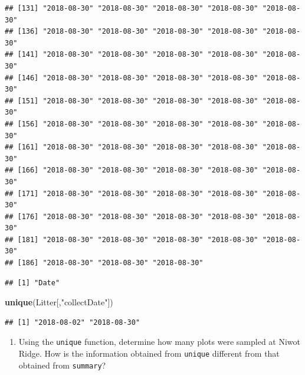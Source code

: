 \documentclass[]{article}
\newenvironment{Shaded}{\begin{snugshade}}{\end{snugshade}}
\newcommand{\KeywordTok}[1]{\textcolor[rgb]{0.13,0.29,0.53}{\textbf{#1}}}
\newcommand{\StringTok}[1]{\textcolor[rgb]{0.31,0.60,0.02}{#1}}
\newcommand{\OperatorTok}[1]{\textcolor[rgb]{0.81,0.36,0.00}{\textbf{#1}}}
\newcommand{\NormalTok}[1]{#1}
\providecommand{\tightlist}{%
  \setlength{\itemsep}{0pt}\setlength{\parskip}{0pt}}
\begin{document}
\begin{verbatim}
## [131] "2018-08-30" "2018-08-30" "2018-08-30" "2018-08-30" "2018-08-30"
## [136] "2018-08-30" "2018-08-30" "2018-08-30" "2018-08-30" "2018-08-30"
## [141] "2018-08-30" "2018-08-30" "2018-08-30" "2018-08-30" "2018-08-30"
## [146] "2018-08-30" "2018-08-30" "2018-08-30" "2018-08-30" "2018-08-30"
## [151] "2018-08-30" "2018-08-30" "2018-08-30" "2018-08-30" "2018-08-30"
## [156] "2018-08-30" "2018-08-30" "2018-08-30" "2018-08-30" "2018-08-30"
## [161] "2018-08-30" "2018-08-30" "2018-08-30" "2018-08-30" "2018-08-30"
## [166] "2018-08-30" "2018-08-30" "2018-08-30" "2018-08-30" "2018-08-30"
## [171] "2018-08-30" "2018-08-30" "2018-08-30" "2018-08-30" "2018-08-30"
## [176] "2018-08-30" "2018-08-30" "2018-08-30" "2018-08-30" "2018-08-30"
## [181] "2018-08-30" "2018-08-30" "2018-08-30" "2018-08-30" "2018-08-30"
## [186] "2018-08-30" "2018-08-30" "2018-08-30"
\end{verbatim}

\begin{Shaded}
\end{Shaded}

\begin{verbatim}
## [1] "Date"
\end{verbatim}

\begin{Shaded}
\begin{Highlighting}[]
\KeywordTok{unique}\NormalTok{(Litter[,}\StringTok{"collectDate"}\NormalTok{])}
\end{Highlighting}
\end{Shaded}

\begin{verbatim}
## [1] "2018-08-02" "2018-08-30"
\end{verbatim}

\begin{enumerate}
\def\labelenumi{\arabic{enumi}.}
\setcounter{enumi}{12}
\tightlist
\item
  Using the \texttt{unique} function, determine how many plots were
  sampled at Niwot Ridge. How is the information obtained from
  \texttt{unique} different from that obtained from \texttt{summary}?
\end{enumerate}

\begin{Shaded}
\end{Shaded}
\end{document}
